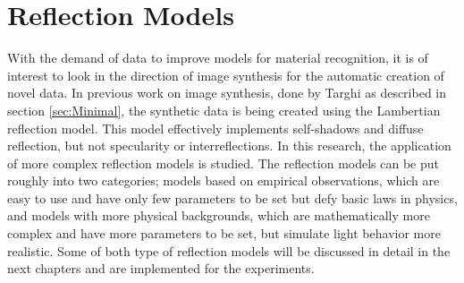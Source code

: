 \section{Reflection Models}\label{sec:ReflectionModels}
With the demand of data to improve models for material recognition, it is of interest to look in the direction of image synthesis for the automatic creation of novel data. In previous work on image synthesis, done by Targhi as described in section \ref{sec:Minimal}, the synthetic data is being created using the Lambertian reflection model. This model effectively implements self-shadows and diffuse reflection, but not specularity or interreflections. In this research, the application of more complex reflection models is studied. The reflection models can be put roughly into two categories; models based on empirical observations, which are easy to use and have only few parameters to be set but defy basic laws in physics, and models with more physical backgrounds, which are mathematically more complex and have more parameters to be set, but simulate light behavior more realistic. Some of both type of reflection models will be discussed in detail in the next chapters and are implemented for the experiments.


